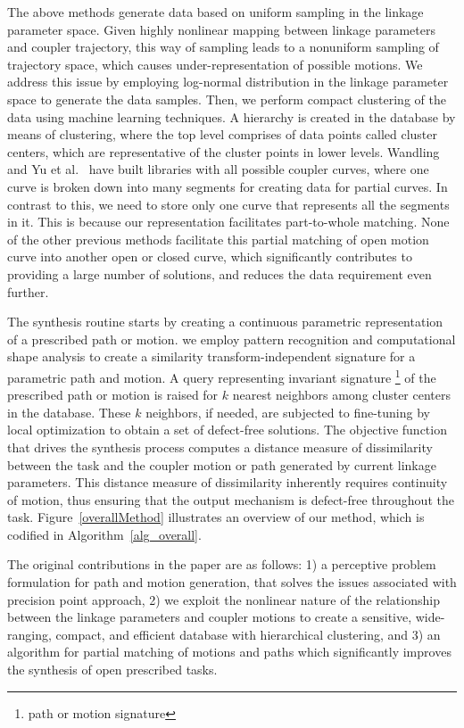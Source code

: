 \documentclass[twocolumn,10pt]{asme2ej}
\begin{document}
The above methods generate data based on uniform sampling in the linkage parameter space.
Given highly nonlinear mapping between linkage parameters and coupler trajectory, this way of sampling leads to a nonuniform sampling of trajectory space, which causes under-representation of possible motions.
We address this issue by employing log-normal distribution in the linkage parameter space to generate the data samples.
Then, we perform compact clustering of the data using machine learning techniques.
A hierarchy is created in the database by means of clustering, where the top level comprises of data points called cluster centers, which are representative of the cluster points in lower levels.
Wandling~\cite{wandling2000} and Yu et al.~\cite{yue-pathgen2011} have built libraries with all possible coupler curves, where one curve is broken down into many segments for creating data for partial curves.
In contrast to this, we need to store only one curve that represents all the segments in it.
This is because our representation facilitates part-to-whole matching.
None of the other previous methods facilitate this partial matching of open motion curve into another open or closed curve, which significantly contributes to providing a large number of solutions, and reduces the data requirement even further.

The synthesis routine starts by creating a continuous parametric representation of a prescribed path or motion.
we employ pattern recognition and computational shape analysis to create a similarity transform-independent signature for a parametric path and motion.
A query representing invariant signature \footnote{path or motion signature} of the prescribed path or motion is raised for $k$ nearest neighbors among cluster centers in the database.
These $k$ neighbors, if needed, are subjected to fine-tuning by local optimization to obtain a set of defect-free solutions.
The objective function that drives the synthesis process computes a distance measure of dissimilarity between the task and the coupler motion or path generated by current linkage parameters.
This distance measure of dissimilarity inherently requires continuity of motion, thus ensuring that the output mechanism is defect-free throughout the task.
Figure~\ref{overallMethod} illustrates an overview of our method, which is codified in Algorithm~\ref{alg_overall}.

The original contributions in the paper are as follows:
1) a perceptive problem formulation for path and motion generation, that solves the issues associated with precision point approach,
2) we exploit the nonlinear nature of the relationship between the linkage parameters and coupler motions to create a sensitive, wide-ranging, compact, and efficient database with hierarchical clustering, and 3) an algorithm for partial matching of motions and paths which significantly improves the synthesis of open prescribed tasks.
\end{document}
